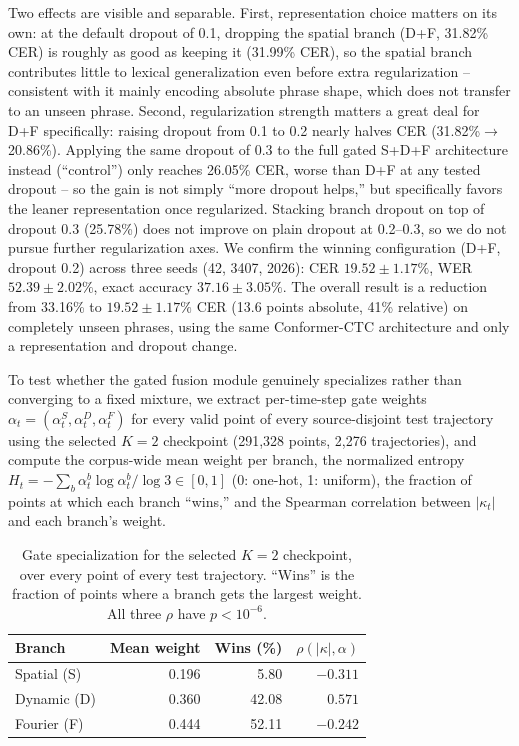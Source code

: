 \documentclass[runningheads]{llncs}
\begin{document}
Two effects are visible and separable. First, representation choice matters on its own: at the default dropout of 0.1, dropping the spatial branch (D+F, 31.82\% CER) is roughly as good as keeping it (31.99\% CER), so the spatial branch contributes little to lexical generalization even before extra regularization -- consistent with it mainly encoding absolute phrase shape, which does not transfer to an unseen phrase. Second, regularization strength matters a great deal for D+F specifically: raising dropout from 0.1 to 0.2 nearly halves CER (31.82\%$\to$20.86\%). Applying the same dropout of 0.3 to the full gated S+D+F architecture instead (``control'') only reaches 26.05\% CER, worse than D+F at any tested dropout -- so the gain is not simply ``more dropout helps,'' but specifically favors the leaner representation once regularized. Stacking branch dropout on top of dropout 0.3 (25.78\%) does not improve on plain dropout at 0.2--0.3, so we do not pursue further regularization axes. We confirm the winning configuration (D+F, dropout 0.2) across three seeds (42, 3407, 2026): CER $19.52\pm1.17\%$, WER $52.39\pm2.02\%$, exact accuracy $37.16\pm3.05\%$. The overall result is a reduction from 33.16\% to $19.52\pm1.17\%$ CER (13.6 points absolute, 41\% relative) on completely unseen phrases, using the same Conformer-CTC architecture and only a representation and dropout change.

To test whether the gated fusion module genuinely specializes rather than converging to a fixed mixture, we extract per-time-step gate weights $\alpha_t=(\alpha_t^S,\alpha_t^D,\alpha_t^F)$ for every valid point of every source-disjoint test trajectory using the selected $K=2$ checkpoint (291{,}328 points, 2{,}276 trajectories), and compute the corpus-wide mean weight per branch, the normalized entropy $H_t=-\sum_b\alpha_t^b\log\alpha_t^b/\log 3\in[0,1]$ (0: one-hot, 1: uniform), the fraction of points at which each branch ``wins,'' and the Spearman correlation between $|\kappa_t|$ and each branch's weight.

\begin{table}[htbp]
\centering
\caption{Gate specialization for the selected $K=2$ checkpoint, over every point of every test trajectory. ``Wins'' is the fraction of points where a branch gets the largest weight. All three $\rho$ have $p<10^{-6}$.}
\label{tab:gate}
\begin{tabular}{lrrr}
\toprule
Branch & Mean weight & Wins (\%) & $\rho(|\kappa|,\alpha)$\\
\midrule
Spatial (S) & 0.196 & 5.80 & $-0.311$\\
Dynamic (D) & 0.360 & 42.08 & $\mathbf{0.571}$\\
Fourier (F) & 0.444 & 52.11 & $-0.242$\\
\bottomrule
\end{tabular}
\end{table}
\end{document}
